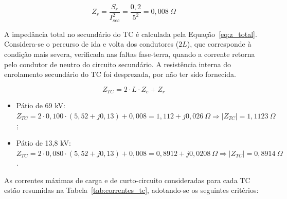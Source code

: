 \begin{equation}
    Z_r = \frac{S_r}{I_{sec}^2} = \frac{0{,}2}{5^2} = 0{,}008~\Omega
\end{equation}

A impedância total no secundário do TC é calculada pela Equação~\eqref{eq:z_total}. Considera-se o percurso de ida e volta dos condutores ($2L$), que corresponde à condição mais severa, verificada nas faltas fase-terra, quando a corrente retorna pelo condutor de neutro do circuito secundário. A resistência interna do enrolamento secundário do TC foi desprezada, por não ter sido fornecida.

\begin{equation}
    Z_{TC} = 2 \cdot L \cdot Z_c + Z_r
    \label{eq:z_total}
\end{equation}

\begin{itemize}
    \item[--] Pátio de 69 kV: $Z_{TC} = 2 \cdot 0{,}100 \cdot (5{,}52 + j0{,}13) + 0{,}008 = 1{,}112 + j0{,}026~\Omega \Rightarrow |Z_{TC}| = 1{,}1123~\Omega$;
    \item[--] Pátio de 13,8 kV: $Z_{TC} = 2 \cdot 0{,}080 \cdot (5{,}52 + j0{,}13) + 0{,}008 = 0{,}8912 + j0{,}0208~\Omega \Rightarrow |Z_{TC}| = 0{,}8914~\Omega$.
\end{itemize}

As correntes máximas de carga e de curto-circuito consideradas para cada TC estão resumidas na Tabela~\ref{tab:correntes_tc}, adotando-se os seguintes critérios:

